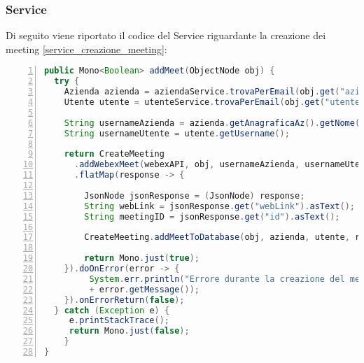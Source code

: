 \subsubsection{Service}
Di seguito viene riportato il codice del Service riguardante la creazione dei meeting \ref{service_creazione_meeting}: 
\begin{lstlisting}[language=java, frame=lines, basicstyle=\ttfamily\scriptsize, numbers=left, 
  label={service_creazione_meeting}, caption={service creazione meeting}]
public Mono<Boolean> addMeet(ObjectNode obj) {
  try {
    Azienda azienda = aziendaService.trovaPerEmail(obj.get("azienda").asText());
    Utente utente = utenteService.trovaPerEmail(obj.get("utente").asText());

    String usernameAzienda = azienda.getAnagraficaAz().getNome();
    String usernameUtente = utente.getUsername();

    return CreateMeeting
      .addWebexMeet(webexAPI, obj, usernameAzienda, usernameUtente)
      .flatMap(response -> {

	    JsonNode jsonResponse = (JsonNode) response;
	    String webLink = jsonResponse.get("webLink").asText();
	    String meetingID = jsonResponse.get("id").asText();

	    CreateMeeting.addMeetToDatabase(obj, azienda, utente, repo, webLink, meetingID);

	    return Mono.just(true);
    }).doOnError(error -> {
         System.err.println("Errore durante la creazione del meeting su Webex: "
         + error.getMessage());
    }).onErrorReturn(false);
  } catch (Exception e) {
     e.printStackTrace();
     return Mono.just(false);
    }
}
\end{lstlisting}
